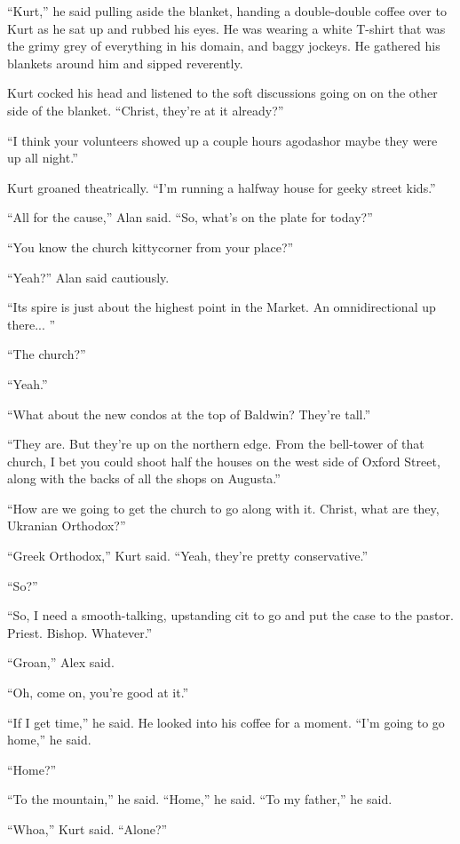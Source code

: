 ``Kurt,'' he said pulling aside the blanket, handing a double-double
coffee over to Kurt as he sat up and rubbed his eyes.  He was wearing
a white T-shirt that was the grimy grey of everything in his domain,
and baggy jockeys.  He gathered his blankets around him and sipped
reverently.

Kurt cocked his head and listened to the soft discussions going on on
the other side of the blanket.  ``Christ, they're at it already?''

``I think your volunteers showed up a couple hours agodash{}or maybe they
were up all night.''

Kurt groaned theatrically.  ``I'm running a halfway house for geeky
street kids.''

``All for the cause,'' Alan said.  ``So, what's on the plate for
today?''

``You know the church kittycorner from your place?''

``Yeah?'' Alan said cautiously.

``Its spire is just about the highest point in the Market.  An
omnidirectional up there...  ''

``The church?''

``Yeah.''

``What about the new condos at the top of Baldwin?  They're tall.''

``They are.  But they're up on the northern edge.  From the bell-tower
of that church, I bet you could shoot half the houses on the west side
of Oxford Street, along with the backs of all the shops on Augusta.''

``How are we going to get the church to go along with it.  Christ,
what are they, Ukranian Orthodox?''

``Greek Orthodox,'' Kurt said.  ``Yeah, they're pretty conservative.''

``So?''

``So, I need a smooth-talking, upstanding cit to go and put the case
to the pastor.  Priest.  Bishop.  Whatever.''

``Groan,'' Alex said.

``Oh, come on, you're good at it.''

``If I get time,'' he said.  He looked into his coffee for a moment. 
``I'm going to go home,'' he said.

``Home?''

``To the mountain,'' he said.  ``Home,'' he said.  ``To my father,''
he said.

``Whoa,'' Kurt said.  ``Alone?''

